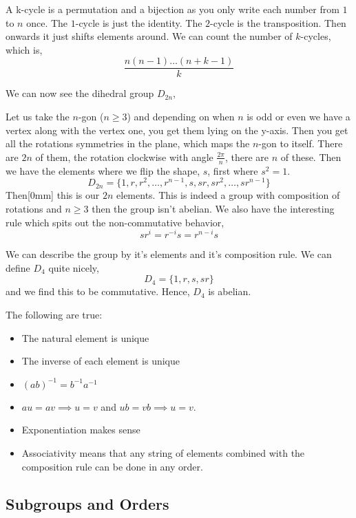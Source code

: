 A k-cycle is a permutation and a bijection as you only write each number from $1$ to $n$ once. The $1$-cycle is just the identity. The $2$-cycle is the transposition. Then onwards it just shifts elements around. We can count the number of $k$-cycles, which is,
$$ \frac{n(n-1) \dots (n + k -1)}{k} $$

We can now see the dihedral group $D_{2n}$,
\begin{ndefi}
  Let us take the $n$-gon ($n \ge 3$) and depending on when $n$ is odd or even we have a vertex along with the vertex one, you get them lying on the y-axis. Then you get all the rotations symmetries in the plane, which maps the $n$-gon to itself. There are $2n$ of them, the rotation clockwise with angle $\frac{2\pi}{n}$, there are $n$ of these. Then we have the elements where we flip the shape, $s$, first where $s^2 = 1$.
  $$ D_{2n} = \{1, r, r^2, \dots, r^{n-1}, s, sr, sr^2, \dots, sr^{n-1} \} $$
  Then[0mm] this is our $2n$ elements. This is indeed a group with composition of rotations and $n \ge 3$ then the group isn't abelian. We also have the interesting rule which spits out the non-commutative behavior,
  $$ sr^i = r^{-i}s = r^{n-i}s $$
\end{ndefi}

We can describe the group by it's elements and it's composition rule. We can define $D_4$ quite nicely,
$$ D_{4} = \{1, r, s, sr\} $$
and we find this to be commutative. Hence, $D_4$ is abelian.

\begin{nlemma}
  The following are true:
  \begin{itemize}
    \item The natural element is unique
    \item The inverse of each element is unique
    \item $(ab)^{-1} = b^{-1}a^{-1}$
    \item $au = av \implies u = v$ and $ub = vb \implies u = v$.
    \item Exponentiation makes sense
    \item Associativity means that any string of elements combined with the composition rule can be done in any order.
  \end{itemize}
\end{nlemma}

\subsection{Subgroups and Orders}


